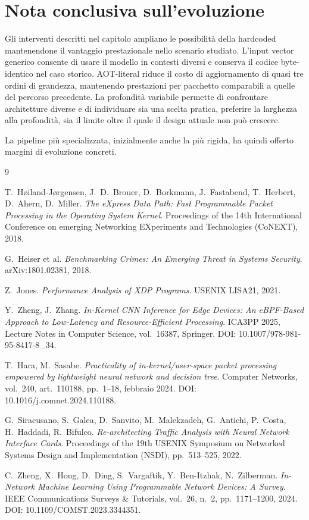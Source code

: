 \documentclass[binding=0.6cm,italian,oneside,noexaminfo]{sapthesis}
\begin{document}
\section{Nota conclusiva sull'evoluzione}

Gli interventi descritti nel capitolo ampliano le possibilità della hardcoded mantenendone il vantaggio prestazionale nello scenario studiato. L'input vector generico consente di usare il modello in contesti diversi e conserva il codice byte-identico nel caso storico. AOT-literal riduce il costo di aggiornamento di quasi tre ordini di grandezza, mantenendo prestazioni per pacchetto comparabili a quelle del percorso precedente. La profondità variabile permette di confrontare architetture diverse e di individuare sia una scelta pratica, preferire la larghezza alla profondità, sia il limite oltre il quale il design attuale non può crescere.

La pipeline più specializzata, inizialmente anche la più rigida, ha quindi offerto margini di evoluzione concreti.

\begin{thebibliography}{9}

T.~Høiland-Jørgensen, J.~D.~Brouer, D.~Borkmann, J.~Fastabend, T.~Herbert, D.~Ahern, D.~Miller.
\emph{The eXpress Data Path: Fast Programmable Packet Processing in the Operating System Kernel}.
Proceedings of the 14th International Conference on emerging Networking EXperiments and Technologies (CoNEXT), 2018.

G.~Heiser et al.
\emph{Benchmarking Crimes: An Emerging Threat in Systems Security}.
arXiv:1801.02381, 2018.

Z.~Jones.
\emph{Performance Analysis of XDP Programs}.
USENIX LISA21, 2021.

Y.~Zheng, J.~Zhang.
\emph{In-Kernel CNN Inference for Edge Devices: An eBPF-Based Approach to Low-Latency and Resource-Efficient Processing}.
ICA3PP 2025, Lecture Notes in Computer Science, vol.~16387, Springer.
DOI: 10.1007/978-981-95-8417-8\_34.

T.~Hara, M.~Sasabe.
\emph{Practicality of in-kernel/user-space packet processing empowered by lightweight neural network and decision tree}.
Computer Networks, vol.~240, art.~110188, pp.~1--18, febbraio 2024.
DOI: 10.1016/j.comnet.2024.110188.

G.~Siracusano, S.~Galea, D.~Sanvito, M.~Malekzadeh, G.~Antichi, P.~Costa, H.~Haddadi, R.~Bifulco.
\emph{Re-architecting Traffic Analysis with Neural Network Interface Cards}.
Proceedings of the 19th USENIX Symposium on Networked Systems Design and Implementation (NSDI), pp.~513--525, 2022.

C.~Zheng, X.~Hong, D.~Ding, S.~Vargaftik, Y.~Ben-Itzhak, N.~Zilberman.
\emph{In-Network Machine Learning Using Programmable Network Devices: A Survey}.
IEEE Communications Surveys \& Tutorials, vol.~26, n.~2, pp.~1171--1200, 2024.
DOI: 10.1109/COMST.2023.3344351.

\end{thebibliography}
\end{document}
